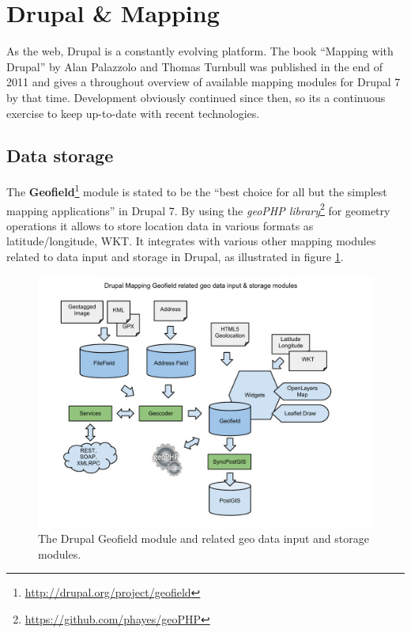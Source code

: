 
%
%

\section{Drupal \& Mapping}
\label{chapter:drupal-mapping}

As the web, Drupal is a constantly evolving platform. The book ``Mapping with Drupal''\cite{Zzolo11mappingdrupal} by Alan Palazzolo and Thomas Turnbull was published in the end of 2011 and gives a throughout overview of available mapping modules for Drupal 7 by that time. Development obviously continued since then, so its a continuous exercise to keep up-to-date with recent technologies.

\subsection{Data storage}

The \textbf{Geofield}\footnote{\url{http://drupal.org/project/geofield}} module is stated to be the ``best choice for all but the simplest mapping applications''\cite[page 27]{Zzolo11mappingdrupal} in Drupal 7. By using the \textit{geoPHP library}\footnote{\url{https://github.com/phayes/geoPHP}} for geometry operations it allows to store location data in various formats as latitude/longitude, WKT. It integrates with various other mapping modules related to data input and storage in Drupal, as illustrated in figure \ref{fig:geofield}.

\begin{figure}[h]
  \begin{center}
    \includegraphics[width=1.2\textwidth]{figures/drupal_mapping_geofield.pdf}
    \caption{The Drupal Geofield module and related geo data input and storage modules.}
    \label{fig:geofield}
  \end{center}
\end{figure}

